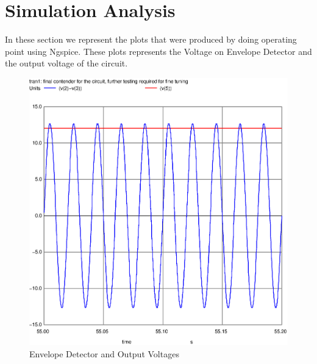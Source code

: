 \section{Simulation Analysis}
\label{sec:simulation} 

In these section we represent the plots that were produced by doing operating point using Ngspice. These plots represents the Voltage on Envelope Detector and the output voltage of the circuit.

\FloatBarrier
\begin{figure}
  \includegraphics[width=\linewidth]{out.ps}
  \caption{Envelope Detector and Output Voltages}
  \label{fig:theoplots}
\end{figure}
\FloatBarrier 

